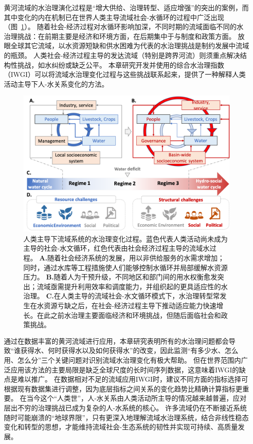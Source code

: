 黄河流域的水治理演化过程是“增大供给、治理转型、适应增强”的突出的案例，而其中变化的内在机制已在世界人类主导流域社会-水循环的过程中广泛出现（图~\ref{fig:summary}）。
随着社会-经济过程对水循环影响加深，不同时期的流域面临不同的水治理挑战：在前期主要是经济和环境方面，在后期集中于与制度和政策方面。
放眼全球其它流域，以水资源短缺和供水困难为代表的水治理挑战是制约发展中流域的瓶颈\cite{allan2019,speed2013,liu2012a}。
人类社会-经济过程主导的发达流域（特别是跨界河流）则须重点解决结构性挑战，如水纠纷或缺乏公平\cite{mirumachi2015}。
本章研究开发并使用的综合水治理指数（IWGI）可以将流域水治理变化过程与这些挑战联系起来，提供了一种解释人类活动主导下人-水关系变化的方法。

\begin{figure}[htbp!]
	\includegraphics[width=\textwidth]{img/ch4/transition.png}
	\caption[人类主导下流域系统的水治理变化过程]{
		人类主导下流域系统的水治理变化过程。蓝色代表人类活动尚未成为主导的社会-水文循环，红色代表由社会经济过程主导的流域水过程。
        \textbf{A.}随着社会经济系统的发展，用以非供给服务的水需求增加；同时，通过水库等工程措施使人们能够控制水循环并局部缓解水资源压力。
        \textbf{B.}随着人为干预升级，不同地区和部门间的用水权衡愈发突出；流域亟需提升利用效率和调度能力，并组织起的更具适应性的水治理。
        \textbf{C.}在人类主导的流域社会-水文循环模式下，水治理转型常发生在水资源亏缺之后，在社会-经济过程主导下推动适应能力快速增长。在此之前水治理主要面临经济和环境挑战，但随后面临社会和政策挑战。
	}\label{fig:summary}
\end{figure}

通过在数据丰富的黄河流域进行应用，本章研究表明所有的水治理问题都会导致“谁获得水、何时获得水以及如何获得水”的改变，因此监测“有多少水、怎么用、怎么分”三个关键问题对识别流域水治理变化有极大帮助。
但在世界范围内广泛应用该方法的主要局限是缺乏全球尺度的长时间序列数据，这意味着IWGI的缺点是难以推广。
在数据相对不足的流域应用IWGI时，建议不同方面的指标选择可根据现有数据集进行调整，因为底层指标之间关系的变化趋势比精确计算指标更重要。
在当今这个“人类世”，人-水关系由人类活动所主导的情况越来越普遍，应对层出不穷的治理挑战已成为复杂的人-水系统的核心\cite{cumming2018,cumming2014,jaeger2019}。
许多流域仍在不断接近系统随时可能崩溃的“地球界限”\cite{gleeson2020, wang-erlandsson2022}，只有更深入地理解流域水治理系统，结合非线性稳态变化和转型的思想，才能维持流域社会-生态系统的韧性并实现可持续、高质量发展\cite{falkenmark2019}。
